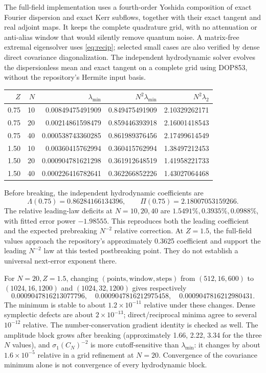 \documentclass[11pt,a4paper]{article}
\begin{document}
The full-field implementation uses a fourth-order Yoshida composition of exact Fourier dispersion and exact Kerr subflows, together with their exact tangent and real adjoint maps. It keeps the complete quadrature grid, with no attenuation or anti-alias window that would silently remove quantum noise. A matrix-free extremal eigensolver uses \eqref{eq:recip}; selected small cases are also verified by dense direct covariance diagonalization. The independent hydrodynamic solver evolves the dispersionless mean and exact tangent on a complete grid using DOP853, without the repository's Hermite input basis.

\begin{center}
\begin{tabular}{@{}rrrrr@{}}\toprule
$Z$ & $N$ & $\lambda_{\min}$ & $N^2\lambda_{\min}$ & $N^2\lambda_2$ \\\midrule
0.75 & 10 & 0.00849475491909 & 0.849475491909 & 2.10329262171 \\
0.75 & 20 & 0.00214861598479 & 0.859446393918 & 2.16001418543 \\
0.75 & 40 & 0.000538743360285 & 0.861989376456 & 2.17499614549 \\
1.50 & 10 & 0.00360415762994 & 0.360415762994 & 1.38497212453 \\
1.50 & 20 & 0.000904781621298 & 0.361912648519 & 1.41958221733 \\
1.50 & 40 & 0.000226416782641 & 0.362266852226 & 1.43027064468 \\\bottomrule
\end{tabular}
\end{center}
Before breaking, the independent hydrodynamic coefficients are
\begin{equation}
\Lambda(0.75)=0.86284166134396,\qquad \Pi(0.75)=2.18007053159266.
\end{equation}
The relative leading-law deficits at $N=10,20,40$ are $1.5491\%,0.3935\%,0.0988\%$, with fitted error power $-1.98555$. This reproduces both the leading coefficient and the expected prebreaking $N^{-2}$ relative correction. At $Z=1.5$, the full-field values approach the repository's approximately 0.3625 coefficient and support the leading $N^{-2}$ law at this tested postbreaking point. They do not establish a universal next-error exponent there.

For $N=20,Z=1.5$, changing $(\text{points},\text{window},\text{steps})$ from $(512,16,600)$ to $(1024,16,1200)$ and $(1024,32,1200)$ gives respectively
\begin{equation}
0.0009047816213077796,\quad
0.0009047816212975458,\quad
0.0009047816212980431.
\end{equation}
The minimum is stable to about $1.2\times10^{-11}$ relative under these changes. Dense symplectic defects are about $2\times10^{-13}$; direct/reciprocal minima agree to several $10^{-12}$ relative. The number-conservation gradient identity is checked as well. The amplitude block grows after breaking (approximately 1.66, 2.22, 3.34 for the three $N$ values), and $\sigma_1(C_N)^{-2}$ is more cutoff-sensitive than $\lambda_{\min}$: it changes by about $1.6\times10^{-5}$ relative in a grid refinement at $N=20$. Convergence of the covariance minimum alone is not convergence of every hydrodynamic block.
\end{document}
